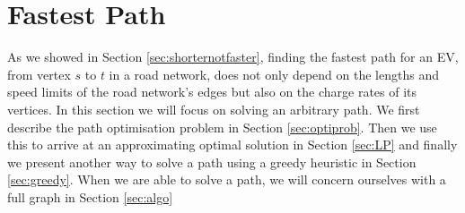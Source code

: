 \section{Fastest Path}
\label{sec:fastestpath}
As we showed in Section \ref{sec:shorternotfaster}, finding the fastest path for an EV, from vertex $s$ to $t$ in a road network, does not only depend on the lengths and speed limits of the road network's edges but also on the charge rates of its vertices. In this section we will focus on solving an arbitrary path. We first describe the path optimisation problem in Section \ref{sec:optiprob}. Then we use this to arrive at an approximating optimal solution in Section \ref{sec:LP} and finally we present another way to solve a path using a greedy heuristic in Section \ref{sec:greedy}. When we are able to solve a path, we will concern ourselves with a full graph in Section \ref{sec:algo}
